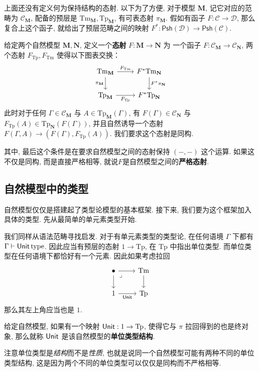 上面还没有定义何为保持结构的态射.
以下为了方便, 对于模型 \(\mathbf M\),
记它对应的范畴为 \(\mathcal C_{\mathbf M}\),
配备的预层是 \(\mathrm{Tm}_{\mathbf M}, \mathrm{Tp}_{\mathbf M}\),
有可表态射 \(\pi_{\mathbf M}\).
假如有函子 \(F : \mathcal C \to \mathcal D\),
那么复合上这个函子, 就给出了预层范畴之间的映射
\(F^* : \mathsf{Psh}(\mathcal D) \to \mathsf{Psh}(\mathcal C)\).

\begin{definition}
给定两个自然模型 \(\mathbf M, \mathbf N\),
定义一个\textbf{态射} \(F : \mathbf M \to \mathbf N\) 为
一个函子 \(F : \mathcal C_{\mathbf M} \to \mathcal C_{\mathbf N}\),
两个态射 \(F_{\mathrm{Tp}} , F_{\mathrm{Tm}}\) 使得以下图表交换：
\[\begin{tikzcd}
  {\mathrm{Tm}_{\mathbf M}} & {F^*\mathrm{Tm}_{\mathbf N}} \\
  {\mathrm{Tp}_{\mathbf M}} & {F^*\mathrm{Tp}_{\mathbf N}}
  \arrow["{F_{\mathrm{Tp}}}"', from=2-1, to=2-2]
  \arrow["{F_{\mathrm{Tm}}}", from=1-1, to=1-2]
  \arrow["{\pi_{\mathbf M}}"', from=1-1, to=2-1]
  \arrow["{F^* \pi_{\mathbf N}}", from=1-2, to=2-2]
\end{tikzcd}\]
此时对于任何 \(\Gamma \in \mathcal C_{\mathbf M}\) 与
\(A \in \mathrm{Tp}_{\mathbf M}(\Gamma)\), 有
\(F(\Gamma) \in \mathcal C_{\mathbf N}\) 与
\(F_{\mathrm{Tp}}(A) \in \mathrm{Tp}_{\mathbf N}(F(\Gamma))\),
并且自然诱导一个态射 \(F(\Gamma, A) \to (F(\Gamma), F_{\mathrm{Tp}}(A))\).
我们要求这个态射是同构.
\end{definition}

其中, 最后这个条件是在要求自然模型之间的态射保持 \((-,-)\) 这个运算.
如果这不仅是同构, 而是直接严格相等, 就说\(F\)是自然模型之间的\textbf{严格态射}.

\subsection{自然模型中的类型}

自然模型仅仅是搭建起了类型论模型的基本框架.
接下来, 我们要为这个框架加入具体的类型.
先从最简单的单元素类型开始.

我们同样从语法范畴寻找启发. 对于有单元素类型的类型论,
在任何语境 \(\Gamma\) 下都有 \(\Gamma \vdash \textnormal{\textsf{Unit}}\,\text{type}\).
因此应当有预层的态射 \(1 \to \mathrm{Tp}\),
在 \(\mathrm{Tp}\) 中指出单位类型.
而单位类型在任何语境下都恰好有一个元素. 因此如果考虑拉回
\[\begin{tikzcd}
  \bullet & {\mathrm{Tm}} \\
  1 & {\mathrm{Tp}}
  \arrow[from=1-2, to=2-2]
  \arrow["{\cons{Unit}}"', from=2-1, to=2-2]
  \arrow[from=1-1, to=2-1]
  \arrow[from=1-1, to=1-2]
  \arrow["\lrcorner"{anchor=center, pos=0.125}, draw=none, from=1-1, to=2-2]
\end{tikzcd}\]
那么其左上角应当也是 \(1\).
\begin{definition}
给定自然模型,
如果有一个映射 \(\textnormal{\textsf{Unit}} : 1 \to \mathrm{Tp}\),
使得它与 \(\pi\) 拉回得到的也是终对象, 那么就称
\(\textnormal{\textsf{Unit}}\) 是该自然模型的\textbf{单位类型结构}.
\end{definition}
注意单位类型是\emph{结构}而不是\emph{性质},
也就是说同一个自然模型可能有两种不同的单位类型结构,
这是因为两个不同的单位类型可以仅仅是同构而不严格相等.

